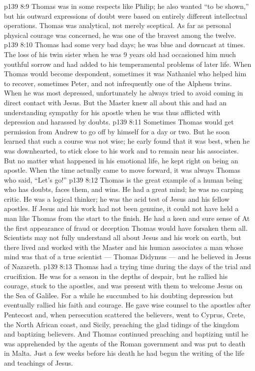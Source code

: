 \vs p139 8:9 Thomas was in some respects like Philip; he also wanted “to be shown,” but his outward expressions of doubt were based on entirely different intellectual operations. Thomas was analytical, not merely sceptical. As far as personal physical courage was concerned, he was one of the bravest among the twelve.
\vs p139 8:10 \pc Thomas had some very bad days; he was blue and downcast at times. The loss of his twin sister when he was 9 years old had occasioned him much youthful sorrow and had added to his temperamental problems of later life. When Thomas would become despondent, sometimes it was Nathaniel who helped him to recover, sometimes Peter, and not infrequently one of the Alpheus twins. When he was most depressed, unfortunately he always tried to avoid coming in direct contact with Jesus. But the Master knew all about this and had an understanding sympathy for his apostle when he was thus afflicted with depression and harassed by doubts.
\vs p139 8:11 Sometimes Thomas would get permission from Andrew to go off by himself for a day or two. But he soon learned that such a course was not wise; he early found that it was best, when he was downhearted, to stick close to his work and to remain near his associates. But no matter what happened in his emotional life, he kept right on being an apostle. When the time actually came to move forward, it was always Thomas who said, “Let’s go!”
\vs p139 8:12 Thomas is the great example of a human being who has doubts, faces them, and wins. He had a great mind; he was no carping critic. He was a logical thinker; he was the acid test of Jesus and his fellow apostles. If Jesus and his work had not been genuine, it could not have held a man like Thomas from the start to the finish. He had a keen and sure sense of  At the first appearance of fraud or deception Thomas would have forsaken them all. Scientists may not fully understand all about Jesus and his work on earth, but there lived and worked with the Master and his human associates a man whose mind was that of a true scientist --- Thomas Didymus --- and he believed in Jesus of Nazareth.
\vs p139 8:13 \pc Thomas had a trying time during the days of the trial and crucifixion. He was for a season in the depths of despair, but he rallied his courage, stuck to the apostles, and was present with them to welcome Jesus on the Sea of Galilee. For a while he succumbed to his doubting depression but eventually rallied his faith and courage. He gave wise counsel to the apostles after Pentecost and, when persecution scattered the believers, went to Cyprus, Crete, the North African coast, and Sicily, preaching the glad tidings of the kingdom and baptizing believers. And Thomas continued preaching and baptizing until he was apprehended by the agents of the Roman government and was put to death in Malta. Just a few weeks before his death he had begun the writing of the life and teachings of Jesus.
